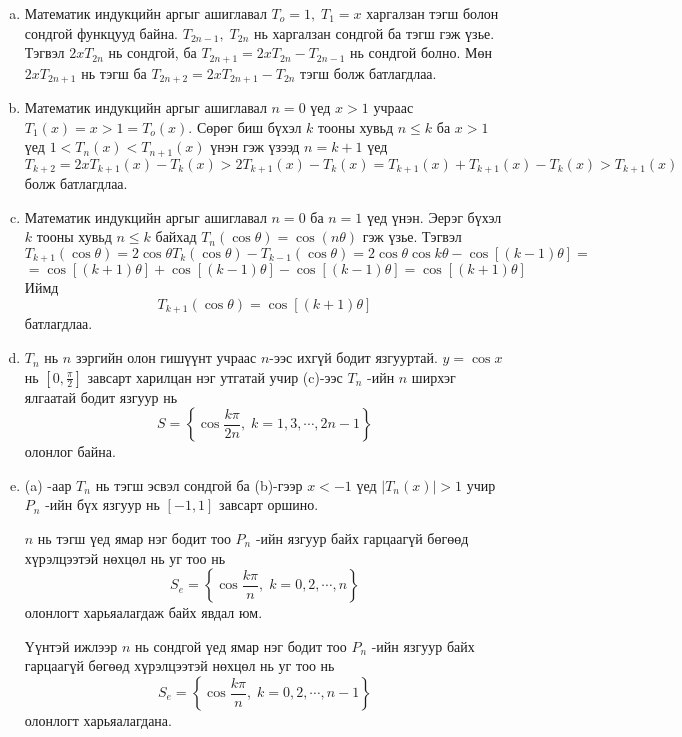 \documentclass[10pt,a4paper,oneside]{book}
\begin{document}
\TheSolution
\begin{enumerate}[(a)]
\item
Математик индукцийн аргыг ашиглавал $T_o = 1, \; T_1 = x$  харгалзан тэгш болон сондгой функцууд байна. $T_{2n-1}, \;T_{2n}$ нь харгалзан сондгой ба тэгш гэж үзье. Тэгвэл $2xT_{2n}$ нь сондгой, ба $T_{2n+1}=2xT_{2n} - T_{2n-1}$ нь сондгой болно. Мөн $2xT_{2n+1}$ нь тэгш ба $T_{2n+2} = 2xT_{2n+1} - T_{2n}$ тэгш болж батлагдлаа.

\item
Математик индукцийн аргыг ашиглавал $n=0$ үед $x>1$ учраас $T_1(x) = x>1 = T_o(x)$. Сөрөг биш бүхэл $k$ тооны хувьд $n \leq k$ ба $x>1$ үед $1< T_n(x) < T_{n+1}(x)$ үнэн гэж үзээд $n=k+1$ үед
$$
T_{k+2} = 2xT_{k+1}(x) - T_k(x) > 2T_{k+1}(x) - T_k(x) = T_{k+1}(x) + T_{k+1}(x) - T_k(x) > T_{k+1}(x)
$$
болж батлагдлаа.

\item
Математик индукцийн аргыг ашиглавал $n=0$ ба $n=1$ үед үнэн. Эерэг бүхэл $k$ тооны хувьд $n \leq k$ байхад $T_n(\cos\theta) = \cos (n\theta)$ гэж үзье. Тэгвэл
$$T_{k+1}(\cos \theta) = 2\cos \theta T_k(\cos \theta) - T_{k-1}(\cos \theta) = 2\cos \theta\cos k\theta - \cos [(k-1)\theta]=$$
$$=\cos [(k+1)\theta] + \cos [(k-1)\theta] - \cos[(k-1)\theta] = \cos [(k+1)\theta]$$
Иймд 
$$
T_{k+1}(\cos \theta) = \cos [(k+1)\theta]
$$
батлагдлаа.

\item
$T_n$ нь $n$ зэргийн олон гишүүнт учраас $n$-ээс ихгүй бодит язгууртай. $y=\cos x$ нь $[0, \frac{\pi}{2}]$ завсарт харилцан нэг утгатай учир (c)-ээс $T_n$ -ийн $n$ ширхэг ялгаатай бодит язгуур нь
$$
S = \left\lbrace \cos \frac{k\pi}{2n}, \; k = 1,3, \cdots, 2n-1 \right\rbrace
$$
олонлог байна.

\item
(a) -аар $T_n$ нь тэгш эсвэл сондгой ба (b)-гээр $x<-1$ үед $|T_n(x)| > 1$  учир $P_n$ -ийн бүх язгуур нь $[-1, 1]$ завсарт оршино.

$n$ нь тэгш үед ямар нэг бодит тоо $P_n$ -ийн язгуур байх гарцаагүй бөгөөд хүрэлцээтэй нөхцөл нь уг тоо нь
$$
S_e = \left\lbrace \cos \frac{k\pi}{n}, \; k = 0,2, \cdots, n \right\rbrace
$$
олонлогт харьяалагдаж байх явдал юм.

Үүнтэй ижлээр $n$ нь сондгой үед ямар нэг бодит тоо $P_n$ -ийн язгуур байх гарцаагүй бөгөөд хүрэлцээтэй нөхцөл нь уг тоо нь
$$
S_e = \left\lbrace \cos \frac{k\pi}{n}, \; k = 0,2, \cdots, n-1 \right\rbrace
$$
олонлогт харьяалагдана.
\end{enumerate}
\end{document}
